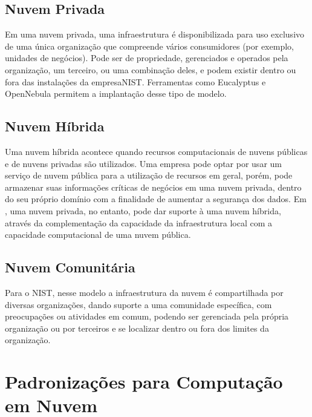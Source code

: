 \subsection{Nuvem Privada} 
\label{computacaoemnuvem:classificacoes:implantacao:privada}

Em uma nuvem privada, uma infraestrutura é disponibilizada para uso exclusivo de
uma única organização que compreende vários consumidores (por exemplo, unidades
de negócios). Pode ser de propriedade, gerenciados e operados pela organização,
um terceiro, ou uma combinação deles, e podem existir dentro ou fora das
instalações da empresa\textsf{NIST}. Ferramentas como Eucalyptus e OpenNebula
permitem a implantação desse tipo de modelo.

\subsection{Nuvem Híbrida} 
\label{computacaoemnuvem:classificacoes:implantacao:hibrida}

Uma nuvem híbrida acontece quando recursos computacionais de nuvens públicas e
de nuvens privadas são utilizados. Uma empresa pode optar por usar um serviço de
nuvem pública para a utilização de recursos em geral, porém, pode armazenar suas
informações críticas de negócios em uma nuvem privada, dentro do seu próprio
domínio com a finalidade de aumentar a segurança dos dados. Em
, uma nuvem privada, no entanto, pode dar suporte à
uma nuvem híbrida, através da complementação da capacidade da infraestrutura
local com a capacidade computacional de uma nuvem pública.

\subsection{Nuvem Comunitária} 
\label{computacaoemnuvem:classificacoes:implantacao:comunitaria}

Para o \textsf{NIST}, nesse modelo a infraestrutura da nuvem é compartilhada
por diversas organizações, dando suporte a uma comunidade específica, com
preocupações ou atividades em comum, podendo ser gerenciada pela própria
organização ou por terceiros e se localizar dentro ou fora dos limites da
organização.

\section{Padronizações para Computação em Nuvem}
\label{computacaoemnuvem:padronizacoes}

